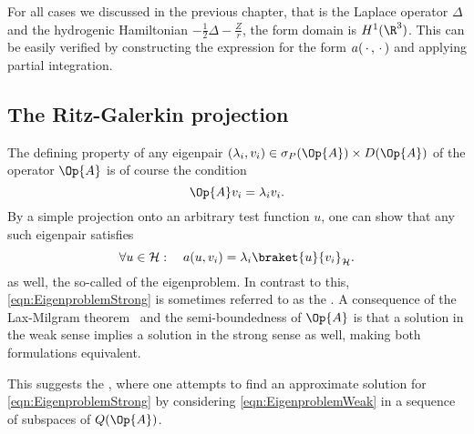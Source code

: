 \begin{exmp}
	For all cases we discussed in the previous chapter,
	that is the Laplace operator $\Delta$ and the hydrogenic
	Hamiltonian $-\frac12 \Delta - \frac{Z}{r}$,
	the form domain is $H^1(\R^3)$.
	This can be easily verified by constructing the expression
	for the form $a(\,\cdot\,, \,\cdot\,)$ and applying partial integration.
\end{exmp}

\subsection{The Ritz-Galerkin projection}
\label{sec:RitzGalerkin}
The defining property of any eigenpair
$(\lambda_i, v_i) \in \sigma_P(\Op{A}) \times D(\Op{A})$
of the operator $\Op{A}$ is of course the condition
\begin{equation}
	\Op{A} v_i = \lambda_i v_i.
	\label{eqn:EigenproblemStrong}
\end{equation}
By a simple projection onto an arbitrary test function $u$,
one can show that any such eigenpair satisfies
\begin{equation}
	\forall u \in \hilbert: \quad a(u, v_i) = \lambda_i \braket{u}{v_i}_\hilbert.
	\label{eqn:EigenproblemWeak}
\end{equation}
as well, the so-called  of the eigenproblem.
In contrast to this, \eqref{eqn:EigenproblemStrong} is sometimes
referred to as the .
A consequence of the Lax-Milgram theorem~\cite[p. 23]{Helffer2013}
and the semi-boundedness of $\Op{A}$
is that a solution in the weak sense implies a solution in the strong sense
as well, making both formulations equivalent.

This suggests the ,
where one attempts to find an approximate solution
for \eqref{eqn:EigenproblemStrong}
by considering \eqref{eqn:EigenproblemWeak}
in a sequence of subspaces of $Q(\Op{A})$.

